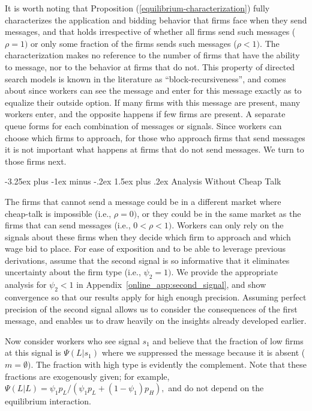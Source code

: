 \documentclass[12pt]{article}
\makeatletter
\renewcommand{\subsection}{%
  \@startsection{subsection}{2}{\z@}%
  {-3.25ex plus -1ex minus -.2ex}%
  {1.5ex plus .2ex}%
  {\normalfont\large\bfseries}%
}
\makeatother
\begin{document}
It is worth noting that Proposition (\ref{equilibrium-characterization})
fully characterizes the application and bidding behavior that firms face
when they send messages, and that holds irrespective of whether all firms
send such messages ($\rho =1)$ or only some fraction of the firms sends such
messages ($\rho <1).$ The characterization makes no reference to the number
of firms that have the ability to message, nor to the behavior at firms that
do not. This property of directed search models is known in the
literature as ``block-recursiveness'', and comes about since workers can see the message and enter for this message exactly as to equalize their outside option. If many firms with this message are present, many workers enter, and the opposite happens if few firms are present. A separate queue forms for each combination of messages or signals. Since workers can choose which firms to approach, for those who
approach firms that send messages it is not important what happens at firms
that do not send messages. We turn to those firms next.



\subsection{Analysis Without Cheap Talk}

The firms that cannot send a message could
be in a different market where cheap-talk is impossible (i.e., $\rho =0)$,
or they could be in the same market as the firms that can send messages
(i.e., $0<\rho <1).$ Workers can only rely on the signals about these firms
when they decide which firm to approach and which wage bid to place. 
For ease of exposition and to be able to leverage previous derivations, assume
that the second signal is so informative that it eliminates uncertainty about
the firm type (i.e., $\psi _{2}=1)$. 
We provide the appropriate analysis for $\psi _{2}<1$ in Appendix~\ref{online_app:second_signal}, and show convergence so that our results apply for high enough precision. Assuming perfect precision of the second signal allows us to consider the consequences of the first message, and enables us to draw heavily on the insights already developed earlier.



Now consider workers who see signal $s_{1}$ and believe that the fraction of
low firms at this signal is $\Psi (L|s_{1})$ where we suppressed the message
because it is absent ($m=\emptyset ).$ The fraction with high type is
evidently the complement. Note that these fractions are exogenously given;
for example, $\Psi (L|L)=\psi _{1}p_{L}/(\psi _{1}p_{L}+(1-\psi
_{1})p_{H}),$ and do not depend on the equilibrium interaction.
\end{document}
